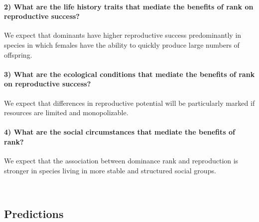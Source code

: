 \documentclass[
]{article}
\begin{document}
\hypertarget{what-are-the-life-history-traits-that-mediate-the-benefits-of-rank-on-reproductive-success}{%
\paragraph{\texorpdfstring{\textbf{2) What are the life history traits
that mediate the benefits of rank on reproductive
success?}}{2) What are the life history traits that mediate the benefits of rank on reproductive success?}}\label{what-are-the-life-history-traits-that-mediate-the-benefits-of-rank-on-reproductive-success}}

We expect that dominants have higher reproductive success predominantly
in species in which females have the ability to quickly produce large
numbers of offspring.

\hypertarget{what-are-the-ecological-conditions-that-mediate-the-benefits-of-rank-on-reproductive-success}{%
\paragraph{\texorpdfstring{\textbf{3) What are the ecological conditions
that mediate the benefits of rank on reproductive
success?}}{3) What are the ecological conditions that mediate the benefits of rank on reproductive success?}}\label{what-are-the-ecological-conditions-that-mediate-the-benefits-of-rank-on-reproductive-success}}

We expect that differences in reproductive potential will be
particularly marked if resources are limited and monopolizable.

\hypertarget{what-are-the-social-circumstances-that-mediate-the-benefits-of-rank}{%
\paragraph{\texorpdfstring{\textbf{4) What are the social circumstances
that mediate the benefits of
rank?}}{4) What are the social circumstances that mediate the benefits of rank?}}\label{what-are-the-social-circumstances-that-mediate-the-benefits-of-rank}}

We expect that the association between dominance rank and reproduction
is stronger in species living in more stable and structured social
groups.

~

\hypertarget{predictions}{%
\subsection{Predictions}\label{predictions}}
\end{document}
